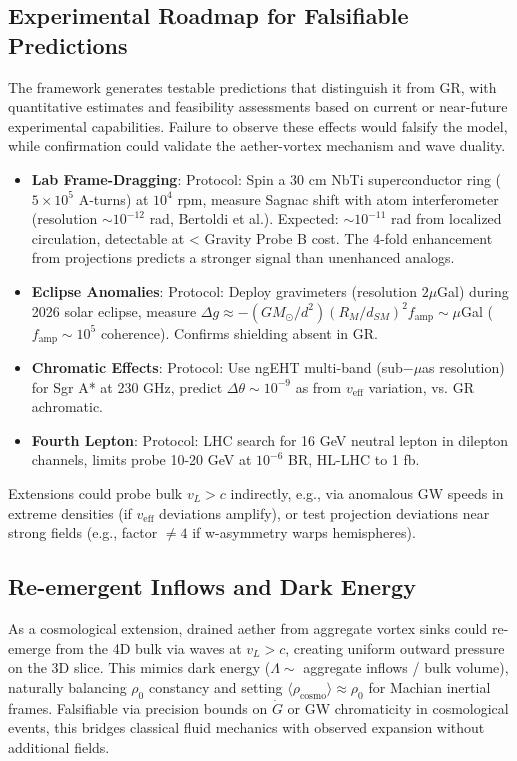 \documentclass{article}
\begin{document}
\subsection{Experimental Roadmap for Falsifiable Predictions}

The framework generates testable predictions that distinguish it from GR, with quantitative estimates and feasibility assessments based on current or near-future experimental capabilities. Failure to observe these effects would falsify the model, while confirmation could validate the aether-vortex mechanism and wave duality.

\begin{itemize}
    \item \textbf{Lab Frame-Dragging}: Protocol: Spin a 30 cm NbTi superconductor ring ($5 \times 10^5$ A-turns) at $10^4$ rpm, measure Sagnac shift with atom interferometer (resolution $\sim 10^{-12}$ rad, Bertoldi et al.). Expected: $\sim 10^{-11}$ rad from localized circulation, detectable at < Gravity Probe B cost. The 4-fold enhancement from projections predicts a stronger signal than unenhanced analogs.
    \item \textbf{Eclipse Anomalies}: Protocol: Deploy gravimeters (resolution $2 \mu$Gal) during 2026 solar eclipse, measure $\Delta g \approx - (GM_\odot / d^2) (R_M / d_{SM})^2 f_{\text{amp}} \sim \mu$Gal ($f_{\text{amp}} \sim 10^5$ coherence). Confirms shielding absent in GR.
    \item \textbf{Chromatic Effects}: Protocol: Use ngEHT multi-band (sub$-\mu$as resolution) for Sgr A* at 230 GHz, predict $\Delta \theta \sim 10^{-9}$ as from $v_{\text{eff}}$ variation, vs. GR achromatic.
    \item \textbf{Fourth Lepton}: Protocol: LHC search for 16 GeV neutral lepton in dilepton channels, limits probe 10-20 GeV at $10^{-6}$ BR, HL-LHC to 1 fb.
\end{itemize}

Extensions could probe bulk $v_L > c$ indirectly, e.g., via anomalous GW speeds in extreme densities (if $v_{\text{eff}}$ deviations amplify), or test projection deviations near strong fields (e.g., factor $\neq 4$ if w-asymmetry warps hemispheres).

\subsection{Re-emergent Inflows and Dark Energy}

As a cosmological extension, drained aether from aggregate vortex sinks could re-emerge from the 4D bulk via waves at $v_L > c$, creating uniform outward pressure on the 3D slice. This mimics dark energy ($\Lambda \sim$ aggregate inflows / bulk volume), naturally balancing $\rho_0$ constancy and setting $\langle \rho_{\text{cosmo}} \rangle \approx \rho_0$ for Machian inertial frames. Falsifiable via precision bounds on $\dot{G}$ or GW chromaticity in cosmological events, this bridges classical fluid mechanics with observed expansion without additional fields.
\end{document}
